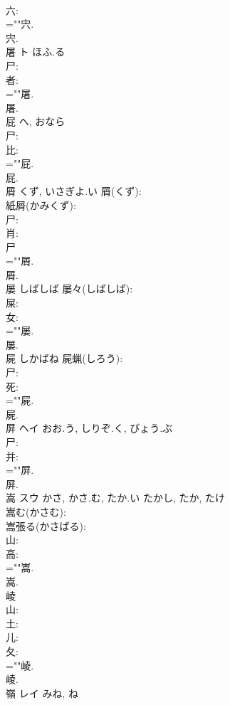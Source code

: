 \documentclass[8pt]{extreport}
\begin{document}
\begin{CJK}{UTF8}{min}
\\	六: 
\\	=""宍.
\\	宍.
\\	屠	ト	ほふ.る		
\\	尸: 
\\	者: 
\\	=""屠.
\\	屠.
\\	屁		へ, おなら				
\\	尸: 
\\	比: 
\\	=""屁.
\\	屁.
\\	屑		くず, いさぎよ.い			屑(くず): 
\\	紙屑(かみくず): 
\\	尸: 
\\	肖: 
\\	尸
\\	=""屑.
\\	屑.
\\	屡		しばしば			屡々(しばしば): 
\\	屎: 
\\	女: 
\\	=""屡.
\\	屡.
\\	屍		しかばね			屍蝋(しろう): 
\\	尸: 
\\	死: 
\\	=""屍.
\\	屍.
\\	屏	ヘイ	おお.う, しりぞ.く, びょう.ぶ		
\\	尸: 
\\	并: 
\\	=""屏.
\\	屏.
\\	嵩	スウ	かさ, かさ.む, たか.い	たかし, たか, たけ	
\\	嵩む(かさむ): 
\\	嵩張る(かさばる): 
\\	山: 
\\	高: 
\\	=""嵩.
\\	嵩.
\\	崚						
\\	山: 
\\	土: 
\\	儿: 
\\	夂: 
\\	=""崚.
\\	崚.
\\	嶺	レイ		みね, ね	

\end{CJK}
\end{document}
